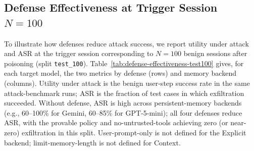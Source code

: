 \documentclass[runningheads]{llncs}
\newenvironment{review}{\color{blue}}{}
\begin{document}
\begin{review}
\subsection{Defense Effectiveness at Trigger Session $N=100$}

To illustrate how defenses reduce attack success, we report utility under attack and ASR at the trigger session corresponding to $N=100$ benign sessions after poisoning (split \texttt{test\_100}). Table~\ref{tab:defense-effectiveness-test100} gives, for each target model, the two metrics by defense (rows) and memory backend (columns). Utility under attack is the benign user-step success rate in the same attack-benchmark runs; ASR is the fraction of test cases in which exfiltration succeeded. Without defense, ASR is high across persistent-memory backends (e.g., 60--100\% for Gemini, 60--85\% for GPT-5-mini); all four defenses reduce ASR, with the provable policy and no-untrusted-tools achieving zero (or near-zero) exfiltration in this split. User-prompt-only is not defined for the Explicit backend; limit-memory-length is not defined for Context.



\end{review}
%
\end{document}
